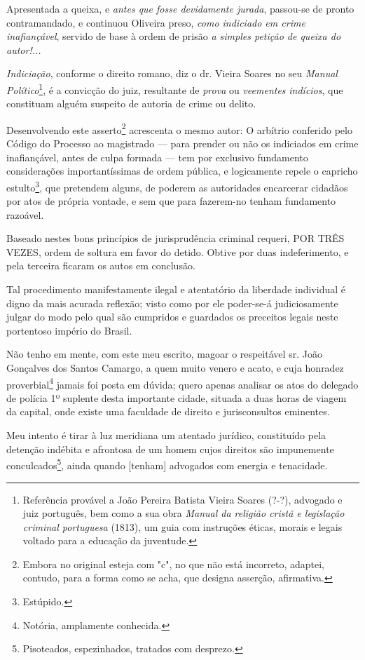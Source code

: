 Apresentada a queixa, e \emph{antes que fosse devidamente jurada},
passou-se de pronto contramandado, e continuou Oliveira preso,
\emph{como indiciado em crime inafiançável}, servido de base à ordem de
prisão \emph{a simples petição de queixa do autor!... }

\emph{Indiciação}, conforme o direito romano, diz o dr. Vieira Soares no
seu \emph{Manual Político}\footnote{Referência provável a João Pereira
  Batista Vieira Soares (?-?), advogado e juiz português, bem como a sua
  obra \emph{Manual da religião cristã e legislação criminal portuguesa}
  (1813), um guia com instruções éticas, morais e legais voltado para a
  educação da juventude.}, é a convicção do juiz, resultante de
\emph{prova} ou \emph{veementes} \emph{indícios}, que constituam alguém
suspeito de autoria de crime ou delito.

Desenvolvendo este asserto\footnote{Embora no original esteja com "c",
  no que não está incorreto, adaptei, contudo, para a forma como se
  acha, que designa asserção, afirmativa.} acrescenta o mesmo autor: O
arbítrio conferido pelo Código do Processo ao magistrado --- para
prender ou não os indiciados em crime inafiançável, antes de culpa
formada --- tem por exclusivo fundamento considerações importantíssimas
de ordem pública, e logicamente repele o capricho estulto\footnote{Estúpido.}, que pretendem alguns, de poderem as autoridades encarcerar
cidadãos por atos de própria vontade, e sem que para fazerem-no tenham
fundamento razoável.

Baseado nestes bons princípios de jurisprudência criminal requeri, POR
TRÊS VEZES, ordem de soltura em favor do detido. Obtive por duas
indeferimento, e pela terceira ficaram os autos em conclusão.

Tal procedimento manifestamente ilegal e atentatório da liberdade
individual é digno da mais acurada reflexão; visto como por ele
poder-se-á judiciosamente julgar do modo pelo qual são cumpridos e
guardados os preceitos legais neste portentoso império do Brasil.

Não tenho em mente, com este meu escrito, magoar o respeitável sr. João
Gonçalves dos Santos Camargo, a quem muito venero e acato, e cuja
honradez proverbial\footnote{Notória, amplamente conhecida.} jamais
foi posta em dúvida; quero apenas analisar os atos do delegado de
polícia 1º suplente desta importante cidade, situada a duas horas de
viagem da capital, onde existe uma faculdade de direito e jurisconsultos
eminentes.

Meu intento é tirar à luz meridiana um atentado jurídico, constituído
pela detenção indébita e afrontosa de um homem cujos direitos são
impunemente conculcados\footnote{Pisoteados, espezinhados, tratados
  com desprezo.}, ainda quando {[}tenham{]} advogados com energia e
tenacidade.

